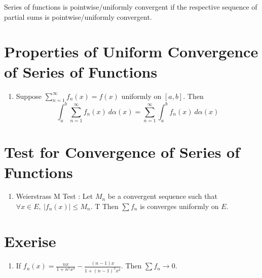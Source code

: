 \begin{definition}
	Series of functions is pointwise/uniformly convergent if the respective sequence of partial sums is pointwise/uniformly convergent.
\end{definition}

\section{Properties of Uniform Convergence of Series of Functions}
\begin{enumerate}
	\item Suppose $\sum_{n=1}^\infty f_n(x) = f(x)$ uniformly on $[a,b]$. Then
	$$\int_a^b \sum_{n=1}^\infty f_n(x)\ d\alpha(x) = \sum_{n=1}^\infty \int_a^b f_n(x)\ d\alpha(x)$$
\end{enumerate}

\section{Test for Convergence of Series of Functions}
\begin{enumerate}
	\item Weierstrass M Test : Let $M_n$ be a convergent sequence such that $\forall x \in E,\ |f_n(x)| \le M_n$. T
	Then $\sum f_n$ is converges uniformly on $E$.
\end{enumerate}

\section*{Exerise}
\begin{enumerate}
	\item If $f_n(x) = \frac{nx}{1+n^2x^2} - \frac{(n-1)x}{1+(n-1)^2x^2}$.
	Then $\sum f_n \to 0$.
\end{enumerate}

